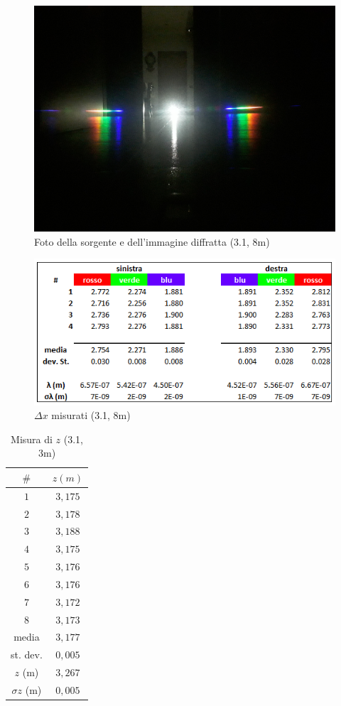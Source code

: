 \documentclass{article}
\begin{document}
\begin{figure}[h!]
  \centering
  \includegraphics[width=0.6\linewidth]{IM 1.1.1}
  \caption{Foto della sorgente e dell'immagine diffratta (3.1, 8m)}
\end{figure}

\begin{figure}[h!]
  \centering
  \includegraphics[width=0.6\linewidth]{IM tab_1.1.1}
  \caption{$\Delta x$ misurati (3.1, 8m)}
\end{figure}

\pagebreak

\begin{table}
\centering
\begin{tabular}{ | c | c | }
  \hline
  $\#$ & $z (m)$ \\
  \hline
  $1$ & $3,175$ \\
  $2$ & $3,178$ \\
  $3$ & $3,188$ \\
  $4$ & $3,175$ \\
  $5$ & $3,176$ \\
  $6$ & $3,176$ \\
  $7$ & $3,172$ \\
  $8$ & $3,173$ \\
  \hline 
  media & $3,177$ \\
  st. dev. & $0,005$ \\
  \hline
  $z$ (m) & $3,267$ \\
  $\sigma z$ (m) & $0,005$ \\
  \hline
\end{tabular}
\caption{Misura di $z$ (3.1, 3m)}
\end{table}
\end{document}
